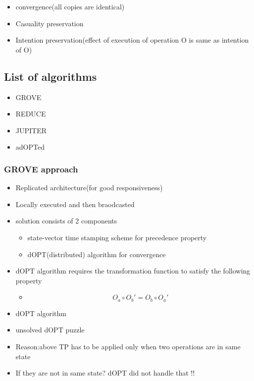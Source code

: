 \begin{itemize}
  


 \item convergence(all copies are identical)
 \item Casuality preservation
 \item  Intention preservation(effect of execution of operation O is same as intention of O)

\end{itemize}


\subsection{List of algorithms}\cite{1998}

\begin{itemize}
 \item GROVE
 \item REDUCE
 \item JUPITER
 \item  adOPTed

\end{itemize}
\subsubsection{GROVE approach}
\begin{itemize}
  \item {
    Replicated architecture(for good responsiveness)
  }
  \item {
    Locally executed and then braodcasted
  }
  \item {
   solution consists of 2 components
   \begin{itemize}
   \item {
   state-vector time stamping scheme for precedence property
   }
   \item{
   dOPT(distributed) algorithm for convergence
   }
   \end{itemize}
  }
  
  
  \item {
    dOPT algorithm requires the transformation function to satisfy the following property
    \begin{itemize}
    \item {
    $$O_a \circ O_b' = O_b \circ O_a'$$
    }
    \end{itemize}
  }
   \item {
   dOPT algorithm 
  }
  \item {
   unsolved dOPT puzzle
  }
  \item {
  Reason:above TP has to be applied only when two operations are in same state 
  }
  \item{
  If they are not in same state? dOPT did not handle that !!
  }

  \end{itemize}
  
